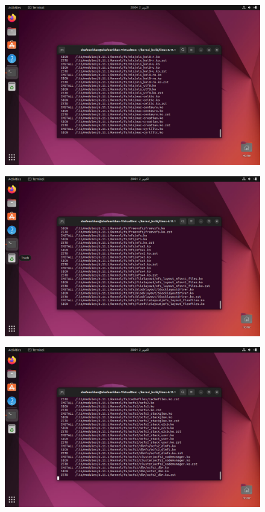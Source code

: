 \documentclass{article}
\begin{document}
\begin{figure}[H]
    \centering
    \includegraphics[width=0.8\linewidth]{13.jpg}
    \caption{ }
\end{figure}

\begin{figure}[H]
    \centering
    \includegraphics[width=0.8\linewidth]{12.jpg}
    \caption{ }
\end{figure}

\begin{figure}[H]
    \centering
    \includegraphics[width=0.8\linewidth]{11.jpg}
    \caption{ }
\end{figure}
\end{document}
